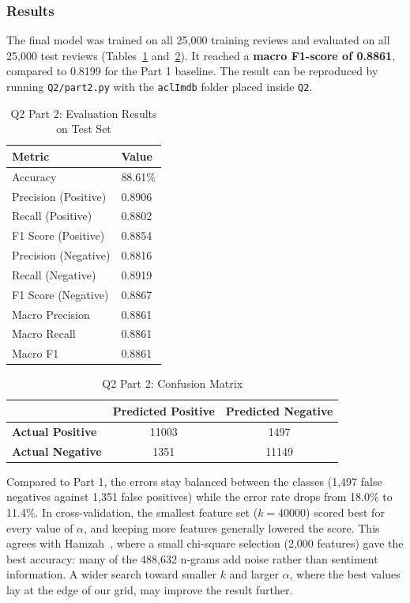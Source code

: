 \documentclass[sigconf]{acmart}
\begin{document}
\subsubsection{Results}
The final model was trained on all 25,000 training reviews and evaluated on all 25,000 test reviews (Tables~\ref{tab:q2p2-metrics} and~\ref{tab:q2p2-confusion}). It reached a \textbf{macro F1-score of 0.8861}, compared to 0.8199 for the Part 1 baseline. The result can be reproduced by running \texttt{Q2/part2.py} with the \texttt{aclImdb} folder placed inside \texttt{Q2}.

\begin{table}[H]
\caption{Q2 Part 2: Evaluation Results on Test Set}
\label{tab:q2p2-metrics}
\begin{tabular}{@{}ll@{}}
\toprule
\textbf{Metric} & \textbf{Value} \\ \midrule
Accuracy & 88.61\% \\
Precision (Positive) & 0.8906 \\
Recall (Positive) & 0.8802 \\
F1 Score (Positive) & 0.8854 \\
Precision (Negative) & 0.8816 \\
Recall (Negative) & 0.8919 \\
F1 Score (Negative) & 0.8867 \\
Macro Precision & 0.8861 \\
Macro Recall & 0.8861 \\
Macro F1 & 0.8861 \\ \bottomrule
\end{tabular}
\end{table}

\begin{table}[H]
\caption{Q2 Part 2: Confusion Matrix}
\label{tab:q2p2-confusion}
\begin{tabular}{@{}lcc@{}}
\toprule
 & \textbf{Predicted Positive} & \textbf{Predicted Negative} \\ \midrule
\textbf{Actual Positive} & 11003 & 1497 \\
\textbf{Actual Negative} & 1351 & 11149 \\ \bottomrule
\end{tabular}
\end{table}

Compared to Part 1, the errors stay balanced between the classes (1,497 false negatives against 1,351 false positives) while the error rate drops from 18.0\% to 11.4\%. In cross-validation, the smallest feature set ($k = 40000$) scored best for every value of $\alpha$, and keeping more features generally lowered the score. This agrees with Hamzah~\cite{hamzah2021}, where a small chi-square selection (2,000 features) gave the best accuracy: many of the 488,632 n-grams add noise rather than sentiment information. A wider search toward smaller $k$ and larger $\alpha$, where the best values lay at the edge of our grid, may improve the result further.
\end{document}
